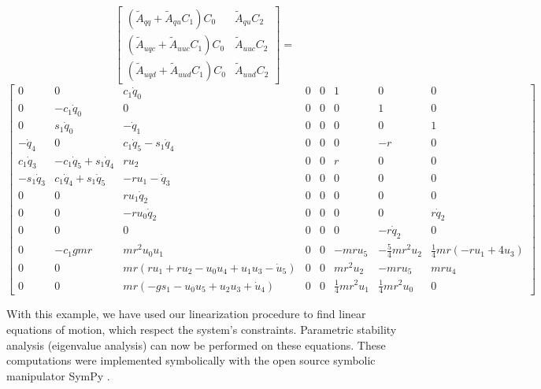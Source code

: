 \documentclass[smallcondensed]{svjour3}                     %
\begin{document}
\begin{equation*}
   \left[
     \begin{array}{cc}
       (\tilde{A}_{qq} + \tilde{A}_{qu} C_1 ) C_0 & \tilde{A}_{qu} C_2 \\
       (\tilde{A}_{uqc} + \tilde{A}_{uuc} C_1 ) C_0 & \tilde{A}_{uuc} C_2\\
       (\tilde{A}_{uqd} + \tilde{A}_{uud} C_1 ) C_0 & \tilde{A}_{uud} C_2
     \end{array}
   \right]=
\end{equation*}
\begin{equation}
\left[\begin{smallmatrix}0 & 0 & c_{1} \dot{q}_{0} & 0 & 0 & 1 & 0 & 0\\0 & - c_{1} \dot{q}_{0} & 0 & 0 & 0 & 0 & 1 & 0\\0 & s_{1} \dot{q}_{0} & - \dot{q}_{1} & 0 & 0 & 0 & 0 & 1\\- \dot{q}_{4} & 0 & c_{1} \dot{q}_{5} - s_{1} \dot{q}_{4} & 0 & 0 & 0 & - r & 0\\c_{1} \dot{q}_{3} & - c_{1} \dot{q}_{5} + s_{1} \dot{q}_{4} & r u_{2} & 0 & 0 & r & 0 & 0\\- s_{1} \dot{q}_{3} & c_{1} \dot{q}_{4} + s_{1} \dot{q}_{5} & - r u_{1} - \dot{q}_{3} & 0 & 0 & 0 & 0 & 0\\0 & 0 & r u_{1} \dot{q}_{2} & 0 & 0 & 0 & 0 & 0\\0 & 0 & - r u_{0} \dot{q}_{2} & 0 & 0 & 0 & 0 & r \dot{q}_{2}\\0 & 0 & 0 & 0 & 0 & 0 & - r \dot{q}_{2} & 0\\0 & - c_{1} g m r & m r^{2} u_{0} u_{1} & 0 & 0 & - m r u_{5} & - \frac{5}{4} m r^{2} u_{2} & \frac{1}{4} m r \left(- r u_{1} + 4 u_{3}\right)\\0 & 0 & m r \left(r u_{1} + r u_{2} - u_{0} u_{4} + u_{1} u_{3} - \dot{u}_{5}\right) & 0 & 0 & m r^{2} u_{2} & - m r u_{5} & m r u_{4}\\0 & 0 & m r \left(- g s_{1} - u_{0} u_{5} + u_{2} u_{3} + \dot{u}_{4}\right) & 0 & 0 & \frac{1}{4} m r^{2} u_{1} & \frac{1}{4} m r^{2} u_{0} & 0\end{smallmatrix}\right]
\end{equation}

With this example, we have used our linearization procedure to find linear
equations of motion, which respect the system's constraints. Parametric
stability analysis (eigenvalue analysis) can now be performed on these
equations.  These computations were implemented symbolically with the open
source symbolic manipulator SymPy \cite{SymPy2012}.
\end{document}

